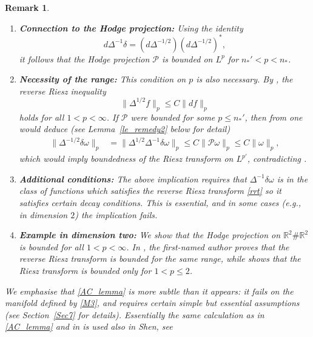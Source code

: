 \documentclass[12pt]{amsart}
\newtheorem{remark}[theorem]{Remark}
\begin{document}
\begin{remark}
\begin{enumerate}[label=\arabic*)]
    \item \textbf{Connection to the Hodge projection:}  
    Using the identity
    \[
    d\Delta^{-1}\delta = \left(d\Delta^{-1/2}\right) \left(d\Delta^{-1/2}\right)^*,
    \]
    it follows that the Hodge projection \( \mathcal{P} \) is bounded on \( L^p \) for \( n_*' < p < n_* \). 

    \item \textbf{Necessity of the range:}  
    This condition on \( p \) is also necessary. By \cite{He2}, the reverse Riesz inequality
    \[
    \|\Delta^{1/2} f\|_p \le C \|d f\|_p
    \]
    holds for all \( 1 < p < \infty \). If \( \mathcal{P} \) were bounded for some \( p \le n_*' \), then from \cite{AC} one would deduce (see Lemma~\ref{le_remedy2} below for detail)
    \begin{align}\label{AC_lemma}
        \| \Delta^{-1/2} \delta \omega\|_{p} 
        &= \| \Delta^{1/2} \Delta^{-1} \delta \omega\|_p 
        \le C \| \mathcal{P} \omega \|_p 
        \le C \|\omega\|_p,
    \end{align}
    which would imply boundedness of the Riesz transform on \( L^{p'} \), contradicting \cite{HS}.

    \item \textbf{Additional conditions:}  
    The above implication requires that \( \Delta^{-1} \delta \omega \) is in the class of functions which satisfies
    the reverse Riesz transform \eqref{rrt} so it satisfies  certain decay conditions. This is essential, and in some cases (e.g., in dimension \( 2 \)) the implication fails.

    \item \textbf{Example in dimension two:}  
    We show that the Hodge projection on \( \mathbb{R}^2 \# \mathbb{R}^2 \) is  bounded for all \( 1 < p < \infty \). In \cite{He2}, the first-named author proves that the reverse Riesz transform is bounded for the same range, while \cite{HNS} shows that the Riesz transform is bounded only for \( 1 < p \le 2 \).
\end{enumerate}

\medskip
We emphasise that \eqref{AC_lemma} is more subtle than it appears: it fails on the manifold defined by \eqref{M3}, and \cite[Lemma~0.1]{AC} requires certain simple but essential assumptions (see Section~\ref{Sec7} for details).  Essentially the same calculation as in \eqref{AC_lemma} and in  \cite[Lemma~0.1]{AC}  is used also  in Shen, see \cite[(3.6) calculation]{shen} 
\end{remark}
\end{document}
